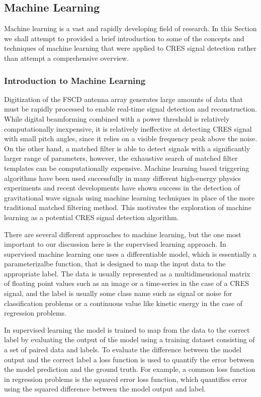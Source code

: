 \subsection{Machine Learning}

Machine learning is a vast and rapidly developing field of research. In this Section we shall attempt to provided a brief introduction to some of the concepts and techniques of machine learning that were applied to CRES signal detection rather than attempt a comprehensive overview.

\subsubsection*{Introduction to Machine Learning}
\label{sec:chap4-intro-ml}

Digitization of the FSCD antenna array generates large amounts of data that must be rapidly processed to enable real-time signal detection and reconstruction. While digital beamforming combined with a power threshold is relatively computationally inexpensive, it is relatively ineffective at detecting CRES signal with small pitch angles, since it relies on a visible frequency peak above the noise. On the other hand, a matched filter is able to detect signals with a significantly larger range of parameters, however, the exhaustive search of matched filter templates can be computationally expensive. Machine learning based triggering algorithms have been used successfully in many different high-energy physics experiments and recent developments have shown success in the detection of gravitational wave signals using machine learning techniques in place of the more traditional matched filtering method. This motivates the exploration of machine learning as a potential CRES signal detection algorithm. 

There are several different approaches to machine learning, but the one most important to our discussion here is the supervised learning approach. In supervised machine learning one uses a differentiable model, which is essentially a parameterizalbe function, that is designed to map the input data to the appropriate label. The data is usually represented as a multidimensional matrix of floating point values such as an image or a time-series in the case of a CRES signal, and the label is usually some class name such as signal or noise for classification problems or a continuous value like kinetic energy in the case of regression problems. 

In supervised learning the model is trained to map from the data to the correct label by evaluating the output of the model using a training dataset consisting of a set of paired data and labels. To evaluate the difference between the model output and the correct label a loss function is used to quantify the error between the model prediction and the ground truth. For example, a common loss function in regression problems is the squared error loss function, which quantifies error using the squared difference between the model output and label. 

